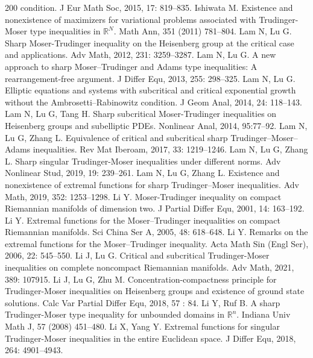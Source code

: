 \documentclass[11pt]{article}
\theoremstyle{plain}
\numberwithin{equation}{section}
\newcommand{\R}{\mathbb{R}}
\begin{document}
\begin{thebibliography}{200}
condition. J Eur Math Soc,  2015, 17: 819--835.
  Ishiwata M. Existence and nonexistence of maximizers for variational problems associated with Trudinger-Moser type inequalities in $\R^{N}$. Math Ann, 351 (2011) 781--804.
 Lam N, Lu G.  Sharp Moser-Trudinger inequality on the Heisenberg group at the critical case and applications. Adv Math,  2012, 231: 3259--3287.
 Lam N, Lu G.  A new approach to sharp Moser--Trudinger and Adams type inequalities: A rearrangement-free
argument. J Differ Equ,   2013, 255: 298--325.
  Lam N,  Lu G. Elliptic equations and systems with subcritical and critical exponential growth without the
Ambrosetti--Rabinowitz condition. J Geom Anal,   2014, 24:  118--143.
 Lam N, Lu G, Tang H. Sharp subcritical Moser-Trudinger inequalities on Heisenberg groups and subelliptic PDEs. Nonlinear Anal, 2014, 95:77--92.
  Lam N,  Lu G,  Zhang L.  Equivalence of critical and subcritical sharp Trudinger--Moser--Adams inequalities. Rev Mat Iberoam,  2017, 33: 1219--1246.
  Lam N,  Lu G,  Zhang L. Sharp singular Trudinger-Moser inequalities under different norms. Adv Nonlinear Stud,  2019, 19: 239--261.
  Lam N,   Lu G, Zhang  L.  Existence and nonexistence of extremal functions for sharp Trudinger--Moser inequalities. Adv Math,   2019, 352: 1253--1298.
   Li Y.  Moser-Trudinger inequality on compact Riemannian manifolds of dimension two. J Partial
Differ Equ,   2001, 14:  163--192.
  Li Y. Extremal functions for the Moser--Trudinger inequalities on compact Riemannian manifolds.  Sci China Ser A,   2005, 48: 618--648.
  Li Y.  Remarks on the extremal functions for the Moser--Trudinger
inequality. Acta Math Sin (Engl Ser),  2006, 22: 545--550.
 Li J,  Lu G. Critical and subcritical Trudinger-Moser inequalities on complete noncompact Riemannian manifolds. Adv Math,  2021, 389:  107915.
  Li J,  Lu G,  Zhu M. Concentration-compactness principle for Trudinger-Moser inequalities on Heisenberg groups and existence of ground state solutions. Calc Var
 Partial Differ Equ, 2018, 57 : 84.
  Li Y,  Ruf B. A sharp Trudinger-Moser type inequality for unbounded domains in $\R^{n}$. Indiana Univ Math J, 57 (2008) 451--480.
  Li X, Yang Y.  Extremal functions for singular Trudinger-Moser inequalities in the entire Euclidean space.  J Differ Equ,   2018, 264: 4901--4943.

\end{thebibliography}
\end{document}
